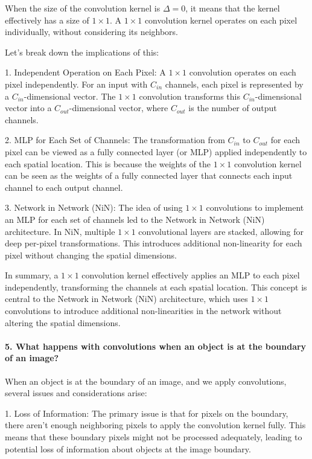 When the size of the convolution kernel is \( \Delta = 0 \), it means that the kernel effectively has a size of \( 1 \times 1 \).
A \( 1 \times 1 \) convolution kernel operates on each pixel individually, without considering its neighbors.

Let's break down the implications of this:

1. Independent Operation on Each Pixel: A \( 1 \times 1 \) convolution operates on each pixel independently. For an input with \( C_{in} \) channels, each pixel is represented by a \( C_{in} \)-dimensional vector. The \( 1 \times 1 \) convolution transforms this \( C_{in} \)-dimensional vector into a \( C_{out} \)-dimensional vector, where \( C_{out} \) is the number of output channels.

2. MLP for Each Set of Channels: The transformation from \( C_{in} \) to \( C_{out} \) for each pixel can be viewed as a fully connected layer (or MLP) applied independently to each spatial location. This is because the weights of the \( 1 \times 1 \) convolution kernel can be seen as the weights of a fully connected layer that connects each input channel to each output channel.

3. Network in Network (NiN): The idea of using \( 1 \times 1 \) convolutions to implement an MLP for each set of channels led to the Network in Network (NiN) architecture. In NiN, multiple \( 1 \times 1 \) convolutional layers are stacked, allowing for deep per-pixel transformations. This introduces additional non-linearity for each pixel without changing the spatial dimensions.

In summary, a \( 1 \times 1 \) convolution kernel effectively applies an MLP to each pixel independently, transforming the channels at each spatial location.
This concept is central to the Network in Network (NiN) architecture, which uses \( 1 \times 1 \) convolutions to introduce additional non-linearities in the network without altering the spatial dimensions.

\paragraph{5. What happens with convolutions when an object is at the boundary of an image?}

When an object is at the boundary of an image, and we apply convolutions, several issues and considerations arise:

1. Loss of Information: The primary issue is that for pixels on the boundary, there aren't enough neighboring pixels to apply the convolution kernel fully. This means that these boundary pixels might not be processed adequately, leading to potential loss of information about objects at the image boundary.

